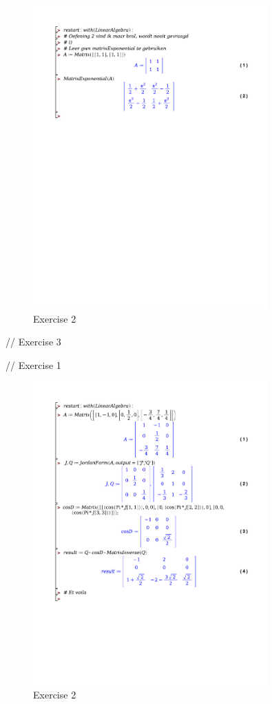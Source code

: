 \documentclass[a4paper]{article}
\begin{document}
\begin{figure}[H]
	\centering
	\includegraphics[width=0.8\textwidth]{exercises/bord_3_ex_2.pdf}
	\caption{Exercise 2}
	\label{fig:bord_3_ex_2}
\end{figure}

// Exercise 3


// Exercise 1


\begin{figure}[H]
	\centering
	\includegraphics[width=0.8\textwidth]{exercises/wc_3_ex_2.pdf}
	\caption{Exercise 2}
	\label{fig:wc_3_ex_2}
\end{figure}
\end{document}
